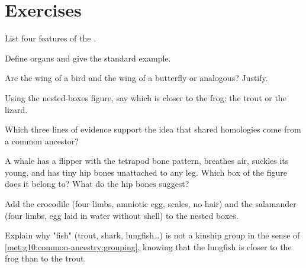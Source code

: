 \section{Exercises}

\begin{exercise}[$\star$]\label{exo:g10:common-ancestry:1}
List four features of the  .
\end{exercise}

\begin{exercise}[$\star$]\label{exo:g10:common-ancestry:2}
Define  organs and give the standard example.
\end{exercise}

\begin{exercise}[$\star$]\label{exo:g10:common-ancestry:3}
Are the wing of a bird and the wing of a butterfly  or
analogous? Justify.
\end{exercise}

\begin{exercise}[$\star$]\label{exo:g10:common-ancestry:4}
Using the nested-boxes figure, say which is closer to the frog: the
trout or the lizard.
\end{exercise}

\begin{exercise}[$\star$]\label{exo:g10:common-ancestry:5}
Which three lines of evidence support the idea that shared homologies
come from a common ancestor?
\end{exercise}

\begin{exercise}[$\star\star$]\label{exo:g10:common-ancestry:6}
A whale has a flipper with the tetrapod bone pattern, breathes air,
suckles its young, and has tiny hip bones unattached to any leg. Which
box of the figure does it belong to? What do the hip bones suggest?
\end{exercise}

\begin{exercise}[$\star\star$]\label{exo:g10:common-ancestry:7}
Add the crocodile (four limbs, amniotic egg, scales, no hair) and the
salamander (four limbs, egg laid in water without shell) to the nested
boxes.
\end{exercise}

\begin{exercise}[$\star\star$]\label{exo:g10:common-ancestry:8}
Explain why "fish" (trout, shark, lungfish\dots) is not a kinship group
in the sense of \cref{met:g10:common-ancestry:grouping}, knowing that
the lungfish is closer to the frog than to the trout.
\end{exercise}

